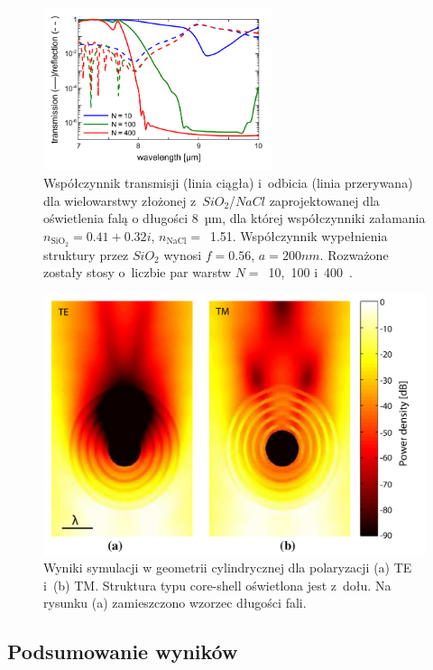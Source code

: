 \begin{figure}[tb]
	\centering
	\includegraphics[width=0.6\textwidth]{images/pml/oqe_trans_refl.png}
	\caption{Współczynnik transmisji (linia ciągła) i~odbicia (linia przerywana) dla wielowarstwy złożonej z~$SiO_2$/$NaCl$ zaprojektowanej dla oświetlenia falą o długości 8~µm, dla której współczynniki załamania $n_{\textrm{SiO}_2}=0.41+0.32i$, $n_{\textrm{NaCl}}=$~1.51. Współczynnik wypełnienia struktury przez $SiO_2$ wynosi $f=0.56$, $a=200nm$. Rozważone zostały stosy o~liczbie par warstw $N=$~10,~100 i~400~\cite{ania2015}.}
	\label{fig:oqe-trans-refl}
\end{figure}

\begin{figure}[tb]
	\includegraphics[width=\textwidth]{images/pml/oqe_coreshell.png}
	\caption{Wyniki symulacji w geometrii cylindrycznej dla polaryzacji (a) TE i~(b) TM. Struktura typu core-shell oświetlona jest z~dołu. Na rysunku (a) zamieszczono wzorzec długości fali.}
	\label{fig:oqecoreshell}
\end{figure}

\subsection{Podsumowanie wyników}

